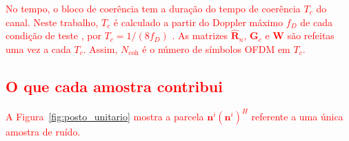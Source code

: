 \textcolor{red}{No tempo, o bloco de coerência tem a duração do tempo de coerência $T_c$ do canal. Neste trabalho, $T_c$ é calculado a partir do Doppler máximo $f_D$ de cada condição de teste \cite{3gpp-ts38104}, por $T_c = 1/(8 f_D)$ \cite[Eq.~2.44]{tse-viswanath}. As matrizes $\hat{\mathbf{R}}_n$, $\mathbf{G}_c$ e $\mathbf{W}$ são refeitas uma vez a cada $T_c$. Assim, $N_{\text{coh}}$ é o número de símbolos OFDM em $T_c$.}

\subsection{\texorpdfstring{\textcolor{red}{O que cada amostra contribui}}{O que cada amostra contribui}}

\textcolor{red}{A Figura~{\hypersetup{linkcolor=red}\ref{fig:posto_unitario}} mostra a parcela $\mathbf{n}^i(\mathbf{n}^i)^H$ referente a uma única amostra de ruído.}

